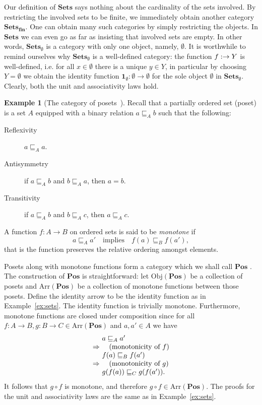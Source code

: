 \documentclass[10pt,twoside,a4paper]{article}
\makeatletter
\newcounter{theorem}
\theoremstyle{plain}
\theoremstyle{definition}
\newtheorem{example}{Example}[section]
\newcommand{\ba}{\begin{array}}
\newcommand{\ea}{\end{array}}
\newenvironment{derivation}{\small\[\ba{@{}r@{~}l@{}}}{\ea\]\normalsize\ignorespacesafterend}
\newcommand{\reason}[1]{\quad (\text{#1})}
\newcommand{\id}[1]{%
  \ensuremath{\mathbf{1}_{#1}}%
}
\newcommand{\Obj}[1]{%
  \ensuremath{\mathrm{Obj}(#1)}%
}
\newcommand{\Arr}[1]{%
  \ensuremath{\mathrm{Arr}(#1)}%
}
\newcommand{\Catname}[1]{%
  \ensuremath{\mathbf{#1}}%
}
\newcommand{\Sets}[0]{\Catname{Sets}}
\newcommand{\Pos}[0]{\Catname{Pos}}
\makeatother
\begin{document}
Our definition of \Sets{} says nothing about the cardinality of the
sets involved. By restricting the involved sets to be finite, we
immediately obtain another category $\Sets_{\mathbf{fin}}$. One can
obtain many such categories by simply restricting the objects. In
\Sets{} we can even go as far as insisting that involved sets are
empty. In other words, $\Sets{}_\emptyset$ is a category with only one
object, namely, $\emptyset$. It is worthwhile to remind ourselves why
$\Sets{}_\emptyset$ is a well-defined category: the function
$f : \empty \to Y$ is well-defined, i.e. for all $x \in \emptyset$
there is a unique $y \in Y$, in particular by choosing $Y = \emptyset$
we obtain the identity function
$\id{\emptyset} : \emptyset \to \emptyset$ for the sole object
$\emptyset$ in $\Sets{}_{\emptyset}$. Clearly, both the unit and
associativity laws hold.

\begin{example}[The category of posets~\cite{Awodey11}]
  Recall that a partially ordered set (poset) is a set $A$ equipped
  with a binary relation $a \sqsubseteq_A b$ such that the following:
  \begin{description}
    \item[Reflexivity] $a \sqsubseteq_A a$.
    \item[Antisymmetry] if $a \sqsubseteq_A b$ and $b \sqsubseteq_A a$, then $a = b$.
    \item[Transitivity] if $a \sqsubseteq_A b$ and $b \sqsubseteq_A c$, then $a \sqsubseteq_A c$.
  \end{description}
  A function $f : A \to B$ on ordered sets is said to be \emph{monotone} if
\[
  a \sqsubseteq_A a' \quad \text{implies} \quad f(a) \sqsubseteq_B f(a'),
\]
that is the function preserves the relative ordering amongst elements.

Posets along with monotone functions form a category which we shall
call \Pos{}. The construction of \Pos{} is straightforward: let
\Obj{\Pos} be a collection of posets and \Arr{\Pos} be a collection of
monotone functions between those posets. Define the identity arrow to
be the identity function as in Example~\ref{ex:sets}. The identity
function is trivially monotone. Furthermore, monotone functions are
closed under composition since for all
$f : A \to B,g : B \to C \in \Arr{\Pos}$ and $a,a' \in A$ we have
\begin{derivation}
 & a \sqsubseteq_A a' \\
 \Rightarrow & \reason{monotonicity of $f$} \\
 &  f(a) \sqsubseteq_B f(a') \\
 \Rightarrow & \reason{monotonicity of $g$} \\
 &   g(f(a)) \sqsubseteq_C g(f(a')).
\end{derivation}
It follows that $g \circ f$ is monotone, and therefore
$g \circ f \in \Arr{\Pos}$. The proofs for the unit and associativity
laws are the same as in Example~\ref{ex:sets}.
\end{example}

%
%


\end{document}
